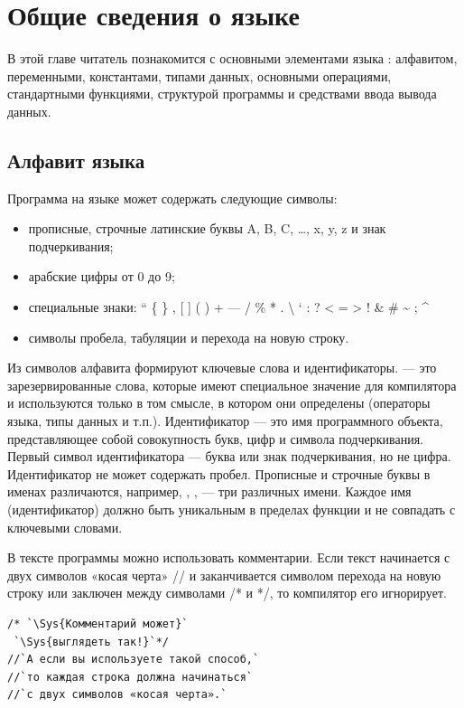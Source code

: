 \chapter[Общие сведения о языке \Sys{С++}]{Общие сведения о языке }\label{gl02}
В этой главе читатель познакомится с основными элементами языка : алфавитом, переменными, константами, типами данных,
основными операциями, стандартными функциями, структурой программы и средствами ввода вывода данных.

\section[Алфавит языка]{Алфавит языка}
Программа на языке  может содержать следующие символы:
\begin{itemize}
\item прописные, строчные латинские буквы A, B, C, …, x, y, z и знак подчеркивания;
\item арабские цифры от 0 до 9;
\item специальные знаки: “ \{ \} , {\textbar} [ ] ( ) + --- / \% * . {\textbackslash} ‘ : ? {<} = {>} !
\& \# \~{} ; \^{}
\item символы пробела, табуляции и перехода на новую строку.
\end{itemize}

Из символов алфавита формируют ключевые слова и идентификаторы. 
 --- это зарезервированные слова, которые имеют специальное значение для компилятора и используются только в том смысле, в
котором они определены (операторы языка, типы данных и т.п.). Идентификатор ---
это имя программного объекта, представляющее собой совокупность букв, цифр и символа подчеркивания. Первый символ
идентификатора --- буква или знак подчеркивания, но не цифра. Идентификатор не может содержать пробел. Прописные и
строчные буквы в именах различаются, например, , ,  --- 
три различных имени. Каждое имя (идентификатор) должно быть уникальным в пределах функции и не совпадать с ключевыми
словами. 

В тексте программы можно использовать комментарии. Если текст начинается с двух
символов «косая черта» // и заканчивается символом перехода на новую строку или заключен между
символами /* и */, то компилятор его игнорирует. 

\begin{lstlisting}
/* `\Sys{Комментарий может}`
 `\Sys{выглядеть так!}`*/
//`А если вы используете такой способ,`
//`то каждая строка должна начинаться`
//`с двух символов «косая черта».`
\end{lstlisting}

